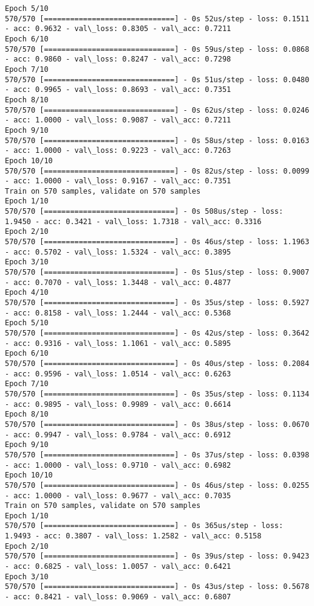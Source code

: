 \documentclass[11pt]{article}
\begin{document}
\begin{Verbatim}[commandchars=\\\{\}]
Epoch 5/10
570/570 [==============================] - 0s 52us/step - loss: 0.1511 - acc: 0.9632 - val\_loss: 0.8305 - val\_acc: 0.7211
Epoch 6/10
570/570 [==============================] - 0s 59us/step - loss: 0.0868 - acc: 0.9860 - val\_loss: 0.8247 - val\_acc: 0.7298
Epoch 7/10
570/570 [==============================] - 0s 51us/step - loss: 0.0480 - acc: 0.9965 - val\_loss: 0.8693 - val\_acc: 0.7351
Epoch 8/10
570/570 [==============================] - 0s 62us/step - loss: 0.0246 - acc: 1.0000 - val\_loss: 0.9087 - val\_acc: 0.7211
Epoch 9/10
570/570 [==============================] - 0s 58us/step - loss: 0.0163 - acc: 1.0000 - val\_loss: 0.9223 - val\_acc: 0.7263
Epoch 10/10
570/570 [==============================] - 0s 82us/step - loss: 0.0099 - acc: 1.0000 - val\_loss: 0.9167 - val\_acc: 0.7351
Train on 570 samples, validate on 570 samples
Epoch 1/10
570/570 [==============================] - 0s 508us/step - loss: 1.9450 - acc: 0.3421 - val\_loss: 1.7318 - val\_acc: 0.3316
Epoch 2/10
570/570 [==============================] - 0s 46us/step - loss: 1.1963 - acc: 0.5702 - val\_loss: 1.5324 - val\_acc: 0.3895
Epoch 3/10
570/570 [==============================] - 0s 51us/step - loss: 0.9007 - acc: 0.7070 - val\_loss: 1.3448 - val\_acc: 0.4877
Epoch 4/10
570/570 [==============================] - 0s 35us/step - loss: 0.5927 - acc: 0.8158 - val\_loss: 1.2444 - val\_acc: 0.5368
Epoch 5/10
570/570 [==============================] - 0s 42us/step - loss: 0.3642 - acc: 0.9316 - val\_loss: 1.1061 - val\_acc: 0.5895
Epoch 6/10
570/570 [==============================] - 0s 40us/step - loss: 0.2084 - acc: 0.9596 - val\_loss: 1.0514 - val\_acc: 0.6263
Epoch 7/10
570/570 [==============================] - 0s 35us/step - loss: 0.1134 - acc: 0.9895 - val\_loss: 0.9989 - val\_acc: 0.6614
Epoch 8/10
570/570 [==============================] - 0s 38us/step - loss: 0.0670 - acc: 0.9947 - val\_loss: 0.9784 - val\_acc: 0.6912
Epoch 9/10
570/570 [==============================] - 0s 37us/step - loss: 0.0398 - acc: 1.0000 - val\_loss: 0.9710 - val\_acc: 0.6982
Epoch 10/10
570/570 [==============================] - 0s 46us/step - loss: 0.0255 - acc: 1.0000 - val\_loss: 0.9677 - val\_acc: 0.7035
Train on 570 samples, validate on 570 samples
Epoch 1/10
570/570 [==============================] - 0s 365us/step - loss: 1.9493 - acc: 0.3807 - val\_loss: 1.2582 - val\_acc: 0.5158
Epoch 2/10
570/570 [==============================] - 0s 39us/step - loss: 0.9423 - acc: 0.6825 - val\_loss: 1.0057 - val\_acc: 0.6421
Epoch 3/10
570/570 [==============================] - 0s 43us/step - loss: 0.5678 - acc: 0.8421 - val\_loss: 0.9069 - val\_acc: 0.6807

\end{Verbatim}
\end{document}
